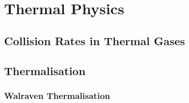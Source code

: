 
\chapter{ Thermal Physics } \label{app:thermalPhysics}

\section{Collision Rates in Thermal Gases} \label{app:collisionRates}

\section{ Thermalisation } \label{app:thermalisation}

\subsection{ Walraven Thermalisation } \label{app:walravenTherm}


